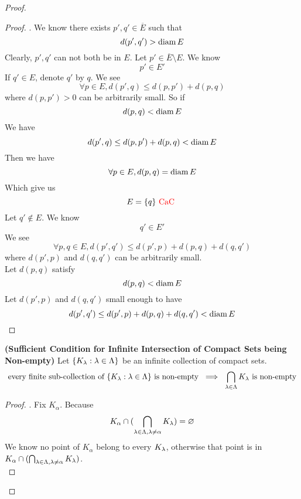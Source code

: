 \documentclass{report}
\begin{document}
\begin{proof}
\begin{proof}
. We know there exists $p',q'\in \overline{E}$ such that
\begin{equation}
d(p',q')>\text{diam}\, E
\end{equation}
Clearly, $p',q'$ can not both be in  $E$. Let $p'\in \overline{E}\setminus E$. We know 
\begin{equation}
p'\in E'
\end{equation}
If $q'\in E$, denote $q'$ by  $q$. We see
\begin{equation}
\forall p\in  E,d(p',q)\leq d(p,p')+d(p,q)
\end{equation}
where $d(p,p')>0$ can be arbitrarily small. So if 
\begin{equation}
d(p,q)<\text{diam}\, E
\end{equation}
We have
\begin{equation}
d(p',q)\leq d(p,p')+d(p,q)<\text{diam}\, E
\end{equation}
Then we have
\begin{equation}
\forall p\in E, d(p,q)=\text{diam}\, E
\end{equation}
Which give us 
\begin{equation}
E=\{ q \}\text{ \textcolor{red}{CaC} }
\end{equation}
Let $q'\not\in E$. We know
\begin{equation}
q'\in E'
\end{equation}
We see 
\begin{equation}
\forall p,q\in E, d(p',q')\leq d(p',p)+d(p,q)+d(q,q')
\end{equation}
where $d(p',p)$ and $d(q,q')$ can be arbitrarily small.\\

Let $d(p,q)$ satisfy 
\begin{equation}
d(p,q)<\text{diam}\, E
\end{equation}
Let $d(p',p)$ and $d(q,q')$ small enough to have 
\begin{equation}
d(p',q')\leq d(p',p)+d(p,q)+d(q,q')<\text{diam}\, E
\end{equation}
\end{proof}
\begin{theorem}
\label{3.9.5}
\textbf{(Sufficient Condition for Infinite Intersection of Compact Sets being Non-empty)} Let $\{ K_\lambda :\lambda \in \Lambda  \}$ be an infinite collection of compact sets.
\begin{equation}
\text{ every finite sub-collection of $\{ K_\lambda:\lambda \in\Lambda  \}$ is non-empty }\implies \text{ $\bigcap_{\lambda\in \Lambda }  K_\lambda $ is non-empty }
\end{equation}
\end{theorem}
\begin{proof}
. Fix $K_{\alpha }$. Because 
\begin{equation}
K_{\alpha }\cap (\bigcap_{\lambda \in \Lambda ,\lambda \neq \alpha }K_{\lambda  })=\varnothing
\end{equation}
We know no point of $K_{\alpha }$ belong to every $K_\lambda $, otherwise that point is in $K_{\alpha }\cap (\bigcap_{\lambda \in \Lambda ,\lambda \neq \alpha }K_\lambda )$.\\


\end{proof}
\end{proof}
\end{document}
